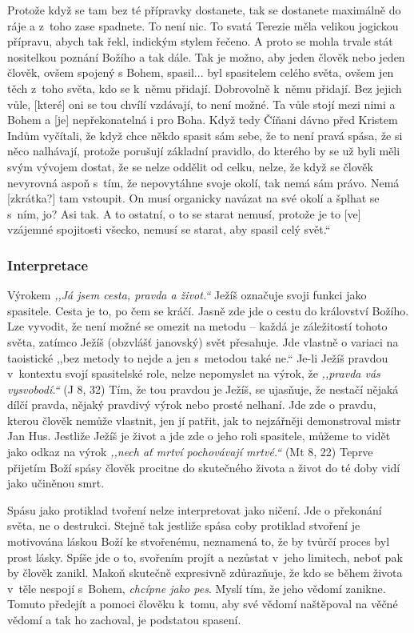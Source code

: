 \begin{enumerate}
{{Protože když se tam bez té přípravky dostanete, tak se dostanete maximálně do
ráje a z~toho zase spadnete. To není nic. To svatá Terezie měla velikou jogickou
přípravu, abych tak řekl, indickým stylem řečeno. A proto se mohla trvale stát
nositelkou poznání Božího a tak dále. Tak je možno, aby jeden člověk nebo jeden
člověk, ovšem spojený s Bohem, spasil... byl spasitelem celého světa, ovšem jen
těch z~toho světa, kdo se k~němu přidají. Dobrovolně k~němu přidají. Bez jejich
vůle, [které] oni se tou chvílí vzdávají, to není možné. Ta vůle stojí mezi nimi
a Bohem a [je] nepřekonatelná i pro Boha. Když tedy Číňani dávno před Kristem
Indům vyčítali, že když chce někdo spasit sám sebe, že to není pravá spása, že
si něco nalhávají, protože porušují základní pravidlo, do kterého by se už byli
měli svým vývojem dostat, že se nelze oddělit od celku, nelze, že když se člověk
nevyrovná aspoň s~tím, že nepovytáhne svoje okolí, tak nemá sám právo. Nemá
[zkrátka?] tam vstoupit. On musí organicky navázat na své okolí a šplhat se
s~ním, jo? Asi tak. A to ostatní, o to se starat nemusí, protože je to [ve]
vzájemné spojitosti všecko, nemusí se starat, aby spasil celý svět.``
}
}

\end{enumerate}

\subsubsection*{Interpretace}

Výrokem \textit{,,Já jsem cesta, pravda a život.``} Ježíš označuje svoji funkci
jako spasitele. Cesta je to, po čem se kráčí. Jasně zde jde o cestu do
království Božího. Lze vyvodit, že není možné se omezit na metodu -- každá
je záležitostí tohoto světa, zatímco Ježíš (obzvlášť janovský) svět přesahuje.
Jde vlastně o variaci na taoistické ,,bez metody to nejde a jen s~metodou také
ne.`` Je-li Ježíš pravdou v~kontextu svojí spasitelské role, nelze nepomyslet na
výrok, že \textit{,,pravda vás vysvobodí.``} (J 8, 32) Tím, že tou pravdou je Ježíš, se ujasňuje,
že nestačí nějaká dílčí pravda, nějaký pravdivý výrok nebo prosté nelhaní. Jde
zde o pravdu, kterou člověk nemůže vlastnit, jen jí patřit, jak to nejzářněji
demonstroval mistr Jan Hus. Jestliže Ježíš je život a jde zde o jeho roli
spasitele, můžeme to vidět jako odkaz na výrok \textit{,,nech ať mrtví pochovávají
mrtvé.``} (Mt 8, 22) Teprve přijetím Boží spásy člověk procitne do skutečného života a život
do té doby vidí jako učiněnou smrt.

Spásu jako protiklad tvoření nelze interpretovat jako ničení. Jde o překonání
světa, ne o destrukci. Stejně tak jestliže spása coby protiklad stvoření je
motivována láskou Boží ke stvořenému, neznamená to, že by tvůrčí proces byl
prost lásky. Spíše jde o to, svořením projít a nezůstat v~jeho limitech, neboť
pak by člověk zanikl. Makoň skutečně expresivně zdůrazňuje, že kdo se během
života v~těle nespojí s~Bohem, \textit{chcípne jako
pes}. Myslí tím, že jeho vědomí
zanikne. Tomuto předejít a pomoci člověku k~tomu, aby své vědomí naštěpoval na
věčné vědomí a tak ho zachoval, je podstatou spasení.

